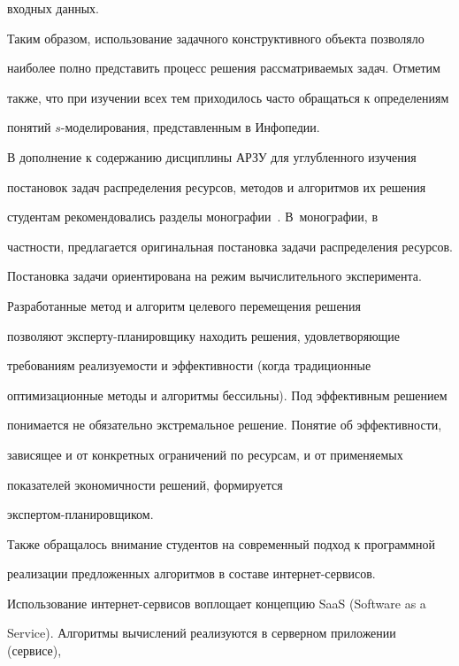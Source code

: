 входных данных.





  Таким образом, использование задачного конструктивного объекта позволяло


наиболее полно представить процесс решения рассматриваемых задач. Отметим


также, что при изучении всех тем приходилось часто обращаться к определениям


понятий $s$-мо\-де\-ли\-ро\-ва\-ния, представленным в Инфопедии.





  В дополнение к содержанию дисциплины АРЗУ для углубленного изучения


постановок задач распределения ресурсов, методов и алгоритмов их решения


студентам рекомендовались разделы монографии~\cite{8-kur}. В~монографии, в


частности, предлагается оригинальная постановка задачи распределения ресурсов.


Постановка задачи ориентирована на режим вычислительного эксперимента.


Разработанные метод и алгоритм целевого перемещения решения~\cite{11-kur}


позволяют экс\-пер\-ту-пла\-ни\-ров\-щи\-ку находить решения, удовлетворяющие


требованиям реализуемости и эффективности (когда традиционные


оптимизационные методы и алгоритмы бессильны). Под эффективным решением


понимается не обязательно экстремальное решение. Понятие об эффективности,


зависящее и от конкретных ограничений по ресурсам, и от применяемых


показателей экономичности решений, формируется


  экс\-пер\-том-пла\-ни\-ров\-щиком.





  Также обращалось внимание студентов на современный подход к программной


реализации предложенных алгоритмов в составе ин\-тер\-нет-сер\-ви\-сов.


Использование ин\-тер\-нет-сер\-ви\-сов воплощает концепцию SaaS (Software as a


Service). Алгоритмы вычислений реализуются в серверном приложении (сервисе),


